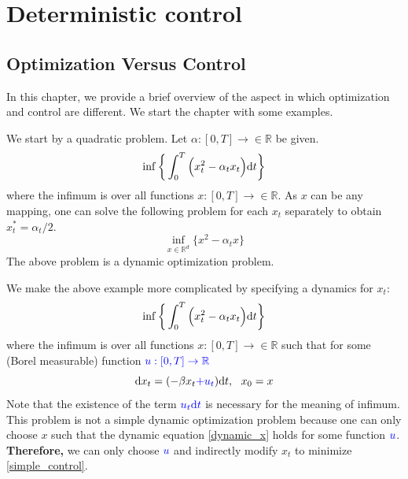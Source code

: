 \documentclass[11pt]{book}
\newcommand{\dt}{\text{\normalfont d}t}
\newcommand{\dx}{\text{\normalfont d}x}
\begin{document}
\newpage
\setcounter{secnumdepth}{2}
\setcounter{page}{1}
\chapter{Deterministic control}
\label{chap:deterministic}
\section{Optimization Versus Control}
\label{sec:opt_control}
In this chapter, we provide a brief overview of the aspect in which optimization and control are different.  We start the chapter with some examples.
\begin{eg}\label{simple_optimization}
We start by a quadratic problem. Let $\alpha:[0,T]\to\in\mathbb{R}$ be given.
    \begin{equation}
        \inf\bigg\{\int_0^T\Big(x_t^2 - \alpha_t x_t\Big) {\dt}\bigg\}
    \end{equation}
where the infimum is over all functions $x:[0,T]\to\in\mathbb{R}$. As $x$ can be any mapping, one can solve the following problem for each $x_t$ separately to obtain $x^*_t=\alpha_t/2$.
    \begin{equation}
        \inf_{x\in\mathbb{R}^d}\bigg\{x^2 - \alpha_t x\bigg\}
    \end{equation}
The above problem is a dynamic optimization problem. 
\end{eg}
\begin{eg}
We make the above example more complicated by specifying a dynamics for $x_t$:
    \begin{equation}\label{simple_control}
        \inf\bigg\{\int_0^T\Big(x_t^2 - \alpha_t x_t\Big) {\dt}\bigg\}
    \end{equation}
where the infimum is over all functions $x:[0,T]\to\in\mathbb{R}$ such that for some (Borel measurable) function ${\color{blue} u:[0,T]\to\mathbb{R}}$
\begin{equation}\label{dynamic_x}
    {\dx}_t = (-\beta x_t  {\color{blue}+ u_t }) {\dt}, ~~ x_0=x
\end{equation}
Note that the existence of the term ${\color{blue} u_t {\dt}}$ is necessary for the meaning of infimum. This problem is not a simple dynamic optimization problem because one can only choose $x$ such that the dynamic equation \eqref{dynamic_x} holds for some function ${\color{blue} u}$. \textbf{Therefore,} we can only choose ${\color{blue} u}$ and indirectly modify $x_t$ to minimize \eqref{simple_control}.
\end{eg}
\end{document}
